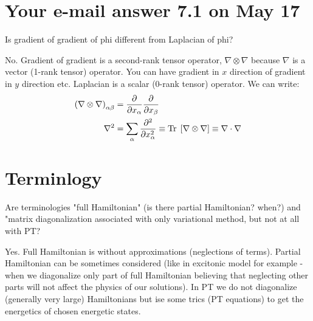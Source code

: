 \documentclass{exam}
\begin{document}
\section{Your e-mail answer 7.1 on May 17}
\begin{questions}

%
\question Is gradient of gradient of phi different from Laplacian of phi?

\begin{solution}
No. Gradient of gradient is a second-rank tensor operator, $\nabla \otimes \nabla$
because $\nabla$ is a vector (1-rank tensor) operator. You can have gradient in $x$ direction
of gradient in $y$ direction etc. Laplacian is a scalar (0-rank tensor) operator.
We can write:
\begin{align}
 \left(\nabla \otimes \nabla \right)_{\alpha\beta} &= \frac{\partial}{\partial x_\alpha} \frac{\partial}{\partial x_\beta} \\
 \nabla^2 &= \sum_\alpha \frac{\partial^2}{\partial x_\alpha^2} \equiv {\rm Tr}\;\left[\nabla \otimes \nabla\right] 
 \equiv \nabla \cdot \nabla
\end{align}

\end{solution}
\end{questions}

\section{Terminlogy}
\begin{questions}

%
\question Are terminologies "full Hamiltonian" (is there partial Hamiltonian? when?) and "matrix diagonalization associated with only variational method, but not at all with PT?

\begin{solution}
Yes. Full Hamiltonian is without approximations (neglections of terms). Partial Hamiltonian
can be sometimes considered (like in excitonic model for example - when we diagonalize
only part of full Hamiltonian believing that neglecting other parts will not affect the physics 
of our solutions). In PT we do not diagonalize (generally very large) Hamiltonians but ise some trics
(PT equations) to get the energetics of chosen energetic states. 
\end{solution}
\end{questions}
\end{document}
